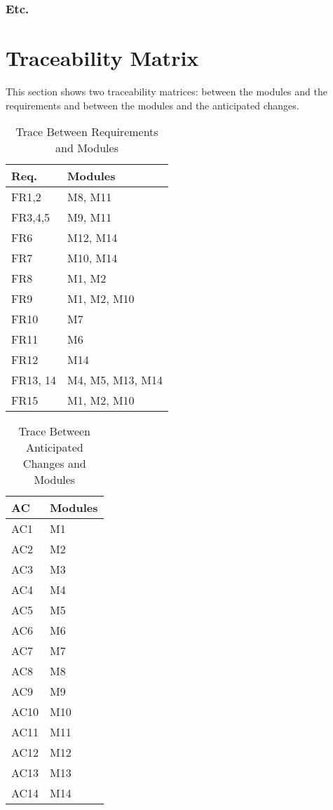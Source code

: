 \documentclass[12pt, titlepage]{article}
\begin{document}
\subsubsection{Etc.}

\section{Traceability Matrix} \label{SecTM}

This section shows two traceability matrices: between the modules and the
requirements and between the modules and the anticipated changes.

\begin{table}[H]
\centering
\begin{tabular}{p{} p{}}
\toprule
\textbf{Req.} & \textbf{Modules}\\
\midrule
FR1,2 & M8, M11\\
FR3,4,5 & M9, M11\\
FR6 & M12, M14\\
FR7 & M10, M14\\
FR8 & M1, M2\\
FR9 & M1, M2, M10\\
FR10 & M7\\
FR11 & M6\\
FR12 & M14\\
FR13, 14 & M4, M5, M13, M14\\
FR15 & M1, M2, M10\\
\bottomrule
\end{tabular}
\caption{Trace Between Requirements and Modules}
\label{TblRT}
\end{table}

\begin{table}[H]
\centering
\begin{tabular}{p{} p{}}
\toprule
\textbf{AC} & \textbf{Modules}\\
\midrule
AC1&M1\\
AC2&M2\\
AC3&M3\\
AC4&M4\\
AC5&M5\\
AC6&M6\\
AC7&M7\\ 
AC8&M8\\
AC9&M9\\
AC10&M10\\
AC11&M11\\
AC12&M12\\
AC13&M13\\
AC14&M14\\
\bottomrule
\end{tabular}
\caption{Trace Between Anticipated Changes and Modules}
\label{TblACT}
\end{table}
\end{document}
